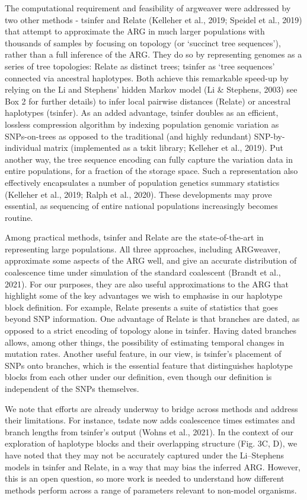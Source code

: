 \documentclass[twocolumn]{bmcart}%
\begin{document}
The computational requirement and feasibility of argweaver were addressed by two other methods - tsinfer and Relate (Kelleher et al., 2019; Speidel et al., 2019) that attempt to approximate the ARG in much larger populations with thousands of samples by focusing on topology (or ‘succinct tree sequences’), rather than a full inference of the ARG. They do so by representing genomes as a series of tree topologies: Relate as distinct trees; tsinfer as ‘tree sequences’ connected via ancestral haplotypes. Both achieve this remarkable speed-up by relying on the Li and Stephens’ hidden Markov model (Li \& Stephens, 2003) see Box 2 for further details) to infer local pairwise distances (Relate) or ancestral haplotypes (tsinfer). As an added advantage, tsinfer doubles as an efficient, lossless compression algorithm by indexing population genomic variation as SNPs-on-trees as opposed to the traditional (and highly redundant) SNP-by-individual matrix (implemented as a tskit library; Kelleher et al., 2019). Put another way, the tree sequence encoding can fully capture the variation data in entire populations, for a fraction of the storage space. Such a representation also effectively encapsulates a number of population genetics summary statistics (Kelleher et al., 2019; Ralph et al., 2020). These developments may prove essential, as sequencing of entire national populations increasingly becomes routine.

Among practical methods, tsinfer and Relate are the state-of-the-art in representing large populations. All three approaches, including ARGweaver, approximate some aspects of the ARG well, and give an accurate distribution of coalescence time under simulation of the standard coalescent (Brandt et al., 2021). For our purposes, they are also useful approximations to the ARG that highlight some of the key advantages we wish to emphasise in our haplotype block definition. For example, Relate presents a suite of statistics that goes beyond SNP information. One advantage of Relate is that branches are dated, as opposed to a strict encoding of topology alone in tsinfer. Having dated branches allows, among other things, the possibility of estimating temporal changes in mutation rates. Another useful feature, in our view, is tsinfer’s placement of SNPs onto branches, which is the essential feature that distinguishes haplotype blocks from each other under our definition, even though our definition is independent of the SNPs themselves.

We note that efforts are already underway to bridge across methods and address their limitations. For instance, tsdate now adds coalescence times estimates and branch lengths from tsinfer’s output (Wohns et al., 2021). In the context of our exploration of haplotype blocks and their overlapping structure (Fig. 3C, D), we have noted that they may not be accurately captured under the Li–Stephens models in tsinfer and Relate, in a way that may bias the inferred ARG. However, this is an open question, so more work is needed to understand how different methods perform across a range of parameters relevant to non-model organisms.
\end{document}
